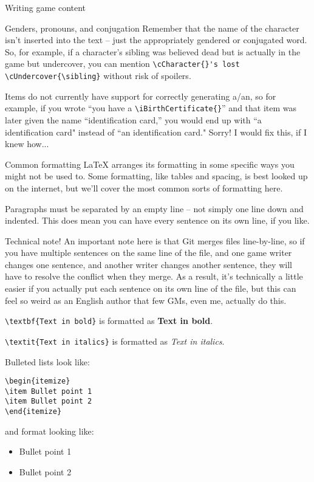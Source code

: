 \documentclass{article}
\begin{document}
\begin{section}{Writing game content}
\begin{subsection}{Genders, pronouns, and conjugation}
Remember that the name of the character isn't inserted into the text – just the appropriately gendered or conjugated word.  So, for example, if a character's sibling was believed dead but is actually in the game but undercover, you can mention \lstinline|\cCharacter{}'s lost \cUndercover{\sibling}| without risk of spoilers.

Items do not currently have support for correctly generating a/an, so for example, if you wrote ``you have a \lstinline|\iBirthCertificate{}|'' and that item was later given the name ``identification card,'' you would end up with ``a identification card" instead of ``an identification card." Sorry!  I would fix this, if I knew how...
\end{subsection}
\begin{subsection}{Common formatting}
LaTeX arranges its formatting in some specific ways you might not be used to.  Some formatting, like tables and spacing, is best looked up on the internet, but we'll cover the most common sorts of formatting here.

Paragraphs must be separated by an empty line – not simply one line down and indented.  This does mean you can have every sentence on its own line, if you like.  

Technical note! An important note here is that Git merges files line-by-line, so if you have multiple sentences on the same line of the file, and one game writer changes one sentence, and another writer changes another sentence, they will have to resolve the conflict when they merge.  As a result, it's technically a little easier if you actually put each sentence on its own line of the file, but this can feel so weird as an English author that few GMs, even me, actually do this.

\lstinline|\textbf{Text in bold}| is formatted as \textbf{Text in bold}.

\lstinline|\textit{Text in italics}| is formatted as \textit{Text in italics}.

Bulleted lists look like:
\begin{verbatim}
\begin{itemize}
\item Bullet point 1
\item Bullet point 2
\end{itemize}
\end{verbatim}
and format looking like:
\begin{itemize}
\item Bullet point 1
\item Bullet point 2
\end{itemize}


\end{subsection}
\end{section}
\end{document}
